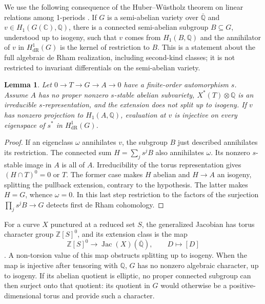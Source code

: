 \documentclass[11pt,a4paper]{article}
\newtheorem{lemma}[theorem]{Lemma}
\theoremstyle{definition}
\theoremstyle{remark}
\numberwithin{equation}{section}
\begin{document}
We use the following consequence of the Huber--W\"ustholz theorem on
linear relations among 1-periods \cite[Theorem~9.7]{dbkz-hw}.
If $G$ is a semi-abelian variety over $\overline{\mathbb Q}$ and
$v\in H_1(G(\mathbb C),\mathbb Q)$, there is a connected semi-abelian
subgroup $B\subseteq G$, understood up to isogeny, such that $v$ comes
from $H_1(B,\mathbb Q)$ and the annihilator of $v$ in
$H^1_{\mathrm{dR}}(G)$ is the kernel of restriction to $B$.
This is a statement about the full algebraic de Rham realization,
including second-kind classes; it is not restricted to invariant
differentials on the semi-abelian variety.

\begin{lemma}\label{log1-eigencriterion}
Let $0\to T\to G\to A\to0$ have a finite-order automorphism $s$.
Assume $A$ has no proper nonzero $s$-stable abelian subvariety,
$X^*(T)\otimes\mathbb Q$ is an irreducible $s$-representation, and the
extension does not split up to isogeny. If $v$ has nonzero projection to
$H_1(A,\mathbb Q)$, evaluation at $v$ is injective on every eigenspace of
$s^*$ in $H^1_{\mathrm{dR}}(G)$.
\end{lemma}
\begin{proof}
If an eigenclass $\omega$ annihilates $v$, the subgroup $B$ just
described annihilates its restriction. The connected sum
$H=\sum_j s^jB$ also annihilates $\omega$. Its nonzero $s$-stable image
in $A$ is all of $A$. Irreducibility of the torus representation gives
$(H\cap T)^0=0$ or $T$. The former case makes $H$ abelian and $H\to A$
an isogeny, splitting the pullback extension, contrary to the hypothesis.
The latter makes $H=G$, whence $\omega=0$. In this last step restriction
to the factors of the surjection $\prod_j s^j B\to G$ detects first
de Rham cohomology.
\end{proof}

For a curve $X$ punctured at a reduced set $S$, the generalized Jacobian
has torus character group $\mathbb Z[S]^0$, and its extension class is
the map
\begin{equation}\label{log1-classmap}
 \mathbb Z[S]^0\longrightarrow\operatorname{Jac}(X)(\overline{\mathbb Q}),
 \qquad D\longmapsto[D]
\end{equation}
\cite[Lemma~4.24]{dbkz-hw}. A non-torsion value of this map obstructs
splitting up to isogeny. When the map is injective after tensoring with
$\mathbb Q$, $G$ has no nonzero algebraic character, up to isogeny.
If its abelian quotient is elliptic, no proper connected subgroup can
then surject onto that quotient: its quotient in $G$ would otherwise
be a positive-dimensional torus and provide such a character.
\end{document}
